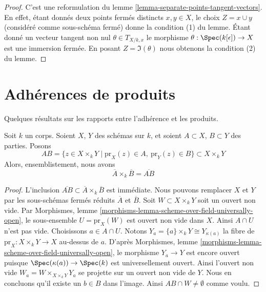 \begin{proof}
C'est une reformulation du lemme
\ref{lemma-separate-points-tangent-vectors}. En effet,
étant donnés deux points fermés distincts $x, y
\in X$, le choix $Z = x \cup y$ (considéré comme
sous-schéma fermé) donne la condition (1) du
lemme. Étant donné un vecteur tangent non nul
$\theta \in T_{X/k, x}$ le morphisme $\theta :
\Spec(k[\epsilon]) \to X$ est une immersion fermée. En
posant $Z = \Im(\theta)$ nous obtenons la condition (2) du lemme.
\end{proof}









\section{Adhérences de produits}
\label{section-closure-of-products}

\noindent
Quelques résultats sur les rapports entre l'adhérence et les produits.

\begin{lemma}
\label{lemma-closure-of-product}
Soit $k$ un corps.
Soient $X$, $Y$ des schémas sur $k$, et soient
$A \subset X$, $B \subset Y$ des
parties. Posons
$$
AB =
\{z \in X \times_k Y \mid \text{pr}_X(z) \in A, \ \text{pr}_Y(z) \in B\}
\subset X \times_k Y
$$
Alors, ensemblistement, nous avons
$$
\overline{A} \times_k \overline{B} = \overline{AB}
$$
\end{lemma}

\begin{proof}
L'inclusion $\overline{AB} \subset \overline{A}
\times_k \overline{B}$ est immédiate. Nous pouvons
remplacer $X$ et $Y$ par les sous-schémas fermés réduits
$\overline{A}$ et $\overline{B}$. Soit $W
\subset X \times_k Y$ soit un ouvert non vide. Par
Morphismes, lemme
\ref{morphisms-lemma-scheme-over-field-universally-open}, le
sous-ensemble $U = \text{pr}_X(W)$ est ouvert non vide dans
$X$. Ainsi $A \cap U$ n'est pas vide. Choisissons $a \in A \cap
U$. Notons $Y_a = \{a\} \times_k Y \cong
Y_{\kappa(a)}$ la fibre de $\text{pr}_X : X \times_k Y \to X$
au-dessus de $a$. D'après Morphismes, lemme
\ref{morphisms-lemma-scheme-over-field-universally-open}, le morphisme
$Y_a \to Y$ est encore ouvert puisque
$\Spec(\kappa(a)) \to \Spec(k)$ est universellement ouvert. Ainsi
l'ouvert non vide $W_a = W \times_{X \times_k Y} Y_a$ se projette
sur un ouvert non vide de $Y$. Nous en concluons qu'il existe un $b
\in B$ dans l'image. Ainsi $AB \cap W \not = \emptyset$ comme voulu.
\end{proof}

